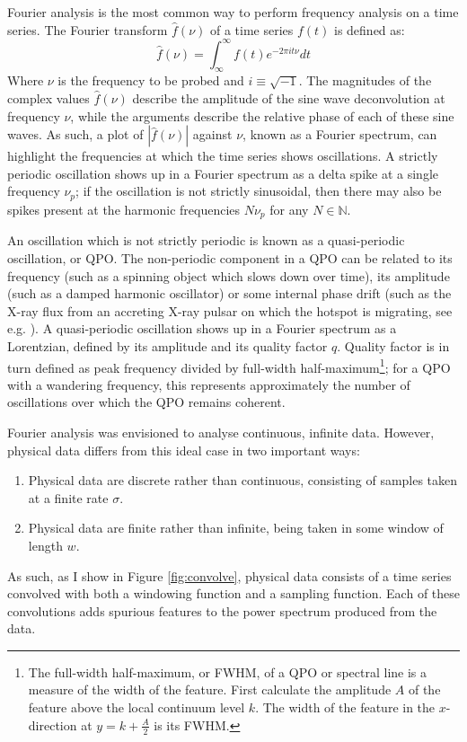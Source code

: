 \par Fourier analysis \citep{Fourier} is the most common way to perform frequency analysis on a time series.  The Fourier transform $\hat{f}(\nu)$ of a time series $f(t)$ is defined as:
\begin{equation}
\hat{f}(\nu)=\int_\infty^\infty f(t)e^{-2\pi it\nu} dt
\end{equation}
Where $\nu$ is the frequency to be probed and $i\equiv\sqrt{-1}$.  The magnitudes of the complex values $\hat{f}(\nu)$ describe the amplitude of the sine wave deconvolution at frequency $\nu$, while the arguments describe the relative phase of each of these sine waves.  As such, a plot of $|\hat{f}(\nu)|$ against $\nu$, known as a Fourier spectrum, can highlight the frequencies at which the time series shows oscillations.  A strictly periodic oscillation shows up in a Fourier spectrum as a delta spike at a single frequency $\nu_p$; if the oscillation is not strictly sinusoidal, then there may also be spikes present at the harmonic frequencies $N\nu_p$ for any $N\in\mathbb{N}$.
\par An oscillation which is not strictly periodic is known as a quasi-periodic oscillation, or QPO.  The non-periodic component in a QPO can be related to its frequency (such as a spinning object which slows down over time), its amplitude (such as a damped harmonic oscillator) or some internal phase drift (such as the X-ray flux from an accreting X-ray pulsar on which the hotspot is migrating, see e.g. \citealp{Patruno_Phase}).  A quasi-periodic oscillation shows up in a Fourier spectrum as a Lorentzian, defined by its amplitude and its quality factor $q$\indexq.  Quality factor is in turn defined as peak frequency divided by full-width half-maximum\footnote{The full-width half-maximum, or FWHM, of a QPO or spectral line is a measure of the width of the feature.  First calculate the amplitude $A$ of the feature above the local continuum level $k$.  The width of the feature in the $x$-direction at $y=k+\frac{A}{2}$ is its FWHM.}; for a QPO with a wandering frequency, this represents approximately the number of oscillations over which the QPO remains coherent.
\label{sec:convolver}
\par Fourier analysis was envisioned to analyse continuous, infinite data.  However, physical data differs from this ideal case in two important ways:
\begin{enumerate}
\item Physical data are discrete rather than continuous, consisting of samples taken at a finite rate $\sigma$.
\item Physical data are finite rather than infinite, being taken in some window of length $w$.
\end{enumerate}
As such, as I show in Figure \ref{fig:convolve}, physical data consists of a time series convolved with both a windowing function and a sampling function.  Each of these convolutions adds spurious features to the power spectrum produced from the data.

